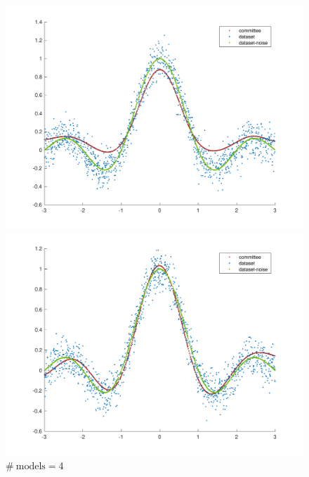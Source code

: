 \begingroup
\setlength{\columnsep}{0.8cm}
\setlength{\intextsep}{0.5cm}
\begin{figure}
\vspace{-1.0cm}
\begin{minipage}{\linewidth}
    \centering\captionsetup[subfigure]{justification=centering}
\includegraphics[width=\linewidth]{../src/figures/committee/sinc_2_models}
    \caption*{$\#\ \text{models} = 2$}
\includegraphics[width=\linewidth]{../src/figures/committee/sinc_4_models}
    \caption*{$\#\ \text{models} = 4$}

\end{minipage}
\end{figure}
